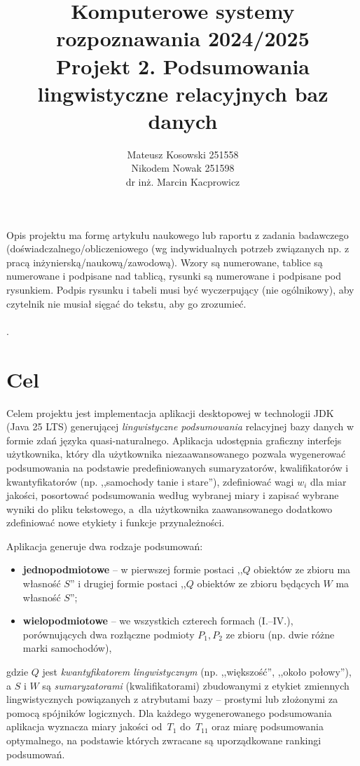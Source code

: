 \documentclass{article}
\author{
    Mateusz Kosowski 251558 \\
    Nikodem Nowak 251598 \\
dr inż. Marcin Kacprowicz
}
\title{Komputerowe systemy rozpoznawania 2024/2025\\Projekt 2. Podsumowania lingwistyczne relacyjnych baz danych}
\begin{document}
\maketitle

Opis projektu ma formę artykułu naukowego lub raportu z zadania
badawczego (doświadczalnego/obliczeniowego (wg indywidualnych potrzeb związanych np. z
pracą inżynierską/naukową/zawodową). Wzory są numerowane, tablice są numerowane i podpisane nad
tablicą, rysunki są numerowane i podpisane pod rysunkiem. Podpis rysunku i
tabeli musi być wyczerpujący (nie ogólnikowy), aby czytelnik nie musiał sięgać do tekstu, aby go zrozumieć.\\
\\
.

\section{Cel}

Celem projektu jest implementacja aplikacji desktopowej w technologii JDK
(Java 25 LTS) generującej \emph{lingwistyczne podsumowania} relacyjnej
bazy danych w formie zdań języka quasi-naturalnego. Aplikacja udostępnia
graficzny interfejs użytkownika, który dla użytkownika niezaawansowanego
pozwala wygenerować podsumowania na podstawie predefiniowanych
sumaryzatorów, kwalifikatorów i kwantyfikatorów (np. ,,samochody tanie
i stare''), zdefiniować wagi $w_i$ dla miar jakości,
posortować podsumowania według wybranej miary i zapisać wybrane wyniki
do pliku tekstowego, a~dla użytkownika zaawansowanego dodatkowo
zdefiniować nowe etykiety i funkcje przynależności.

Aplikacja generuje dwa rodzaje podsumowań:
\begin{itemize}
    \item \textbf{jednopodmiotowe} -- w pierwszej formie postaci ,,$Q$ obiektów
    ze zbioru ma własność $S$'' i drugiej formie postaci ,,$Q$ obiektów
    ze zbioru będących $W$ ma własność $S$'';
    \item \textbf{wielopodmiotowe} -- we wszystkich czterech formach
    (I.--IV.), porównujących dwa rozłączne podmioty $P_1, P_2$ ze zbioru
    (np. dwie różne marki samochodów),
\end{itemize}
gdzie $Q$ jest \emph{kwantyfikatorem lingwistycznym} (np. ,,większość'',
,,około połowy''), a $S$ i $W$ są \emph{sumaryzatorami} (kwalifikatorami)
zbudowanymi z etykiet zmiennych lingwistycznych powiązanych z atrybutami
bazy -- prostymi lub złożonymi za pomocą spójników logicznych. Dla każdego
wygenerowanego podsumowania aplikacja wyznacza miary jakości od~$T_1$
do~$T_{11}$ oraz miarę podsumowania optymalnego, na podstawie których
zwracane są uporządkowane rankingi podsumowań.
\end{document}
